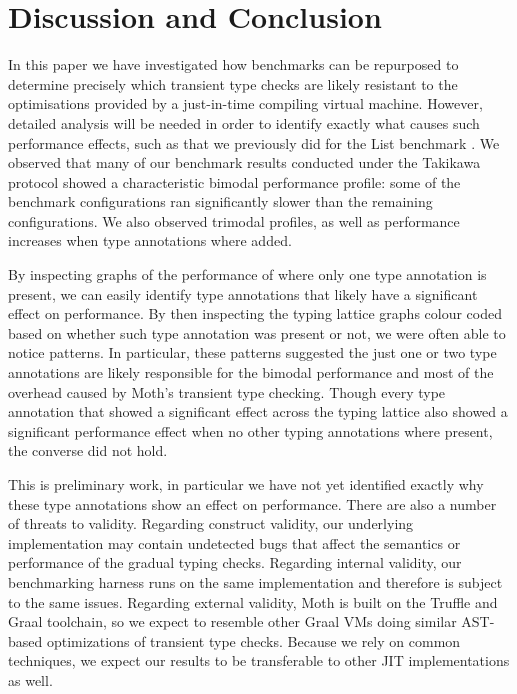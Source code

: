 \documentclass[sigplan,screen]{acmart}
\newcommand{\RR}[1]{{\color{red}RR: #1}}
\begin{document}
\section{Discussion and Conclusion}
\label{s-concl}

In this paper we have investigated how benchmarks can be
repurposed to determine precisely which transient type checks are
likely resistant to the optimisations provided by a just-in-time compiling
virtual machine.
However, detailed analysis will be needed in order to identify exactly what causes such performance effects, such as that we previously did for the List benchmark \cite{roberts-and-co-ecoop-2019}.
We observed that many of our benchmark results
conducted under the Takikawa protocol 
showed a characteristic bimodal performance profile: some
of the benchmark configurations ran significantly slower than
the remaining configurations. We also observed trimodal profiles, as well as performance increases when type annotations where added.

By inspecting graphs of the performance of where only one type annotation is present, we can easily identify type annotations that likely have a significant effect on performance. By then inspecting the typing lattice graphs colour coded based on whether such type annotation was present or not, we were often able to notice patterns.
In particular, these patterns suggested the just one or two type annotations are likely responsible for the bimodal performance and most of the overhead caused by Moth's transient type checking.
Though every type annotation that showed a significant effect across the typing lattice also showed a significant performance effect when no other typing annotations where present, the converse did not hold.

This is preliminary work, in particular we have not yet identified exactly why these type annotations show an effect on performance.
There are also a number of threats to validity. 
Regarding construct validity, 
our underlying
implementation may contain undetected bugs that affect the semantics
or performance of the gradual typing checks. Regarding internal
validity,
our benchmarking harness runs on the same implementation
and therefore is subject to the same issues.
Regarding external validity, 
Moth is built
on the Truffle and Graal toolchain, so we expect
to resemble other Graal
VMs doing similar AST-based optimizations of transient type checks.
Because we rely on common techniques, 
we expect our results to be transferable to other JIT implementations as well.
\end{document}
